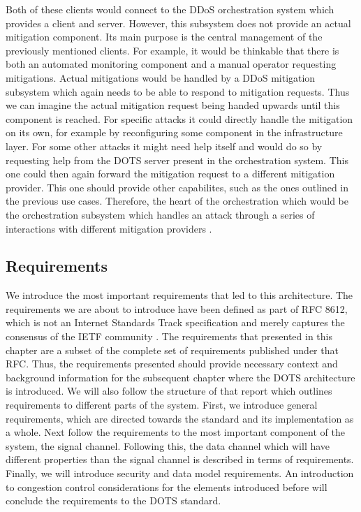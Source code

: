 Both of these clients would connect to the DDoS orchestration system which provides a client and server. However, this subsystem does not provide an actual mitigation component. Its main purpose is the central management of the previously mentioned clients. For example, it would be thinkable that there is both an automated monitoring component and a manual operator requesting mitigations. Actual mitigations would be handled by a DDoS mitigation subsystem which again needs to be able to respond to mitigation requests. Thus we can imagine the actual mitigation request being handed upwards until this component is reached. For specific attacks it could directly handle the mitigation on its own, for example by reconfiguring some component in the infrastructure layer. For some other attacks it might need help itself and would do so by requesting help from the DOTS server present in the orchestration system. This one could then again forward the mitigation request to a different mitigation provider. This one should provide other capabilites, such as the ones outlined in the previous use cases. Therefore, the heart of the orchestration which would be the orchestration subsystem which handles an attack through a series of interactions with different mitigation providers \cite{dots-use-cases}.

\subsection{Requirements}\label{sec:requirements}
We introduce the most important requirements that led to this architecture. The requirements we are about to introduce have been defined as part of RFC 8612, which is not an Internet Standards Track specification and merely captures the consensus of the IETF community \cite{rfc8612}.
The requirements that presented in this chapter are a subset of the complete set of requirements published under that RFC. Thus, the requirements presented should provide necessary context and background information for the subsequent chapter where the DOTS architecture is introduced. We will also follow the structure of that report which outlines requirements to different parts of the system. First, we introduce general requirements, which are directed towards the standard and its implementation as a whole. Next follow the requirements to the most important component of the system, the signal channel. Following this, the data channel which will have different properties than the signal channel is described in terms of requirements. Finally, we will introduce security and data model requirements. An introduction to congestion control considerations for the elements introduced before will conclude the requirements to the DOTS standard.
